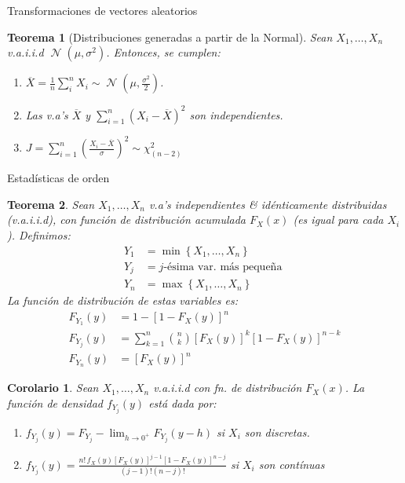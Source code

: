 \documentclass[a4paper]{article}
\theoremstyle{mytheoremstyle}
\newtheorem{theorem}{Teorema}
\newtheorem{corollary}{Corolario}[theorem]
\newcommand{\1}{\mathds{1}}
\DeclareMathOperator{\dnormal}{\mathcal{N}}
\begin{document}
\begin{multicols*}{3}
\begin{roundbox}{Transformaciones de vectores aleatorios}
\begin{theorem}[Distribuciones generadas a partir de la Normal]
    Sean $X_1, \dots, X_n$ v.a.i.i.d $\dnormal(\mu, \sigma^{2})$.
    Entonces, se cumplen:
    \begin{enumerate}
        \item $\overline{X} = \frac{1}{n} \sum_{i}^{n} X_i \sim \dnormal(\mu, \frac{\sigma^{2}}{2})$.
        \item Las v.a's $\overline{X}$ y $\sum_{i=1}^{n} (X_i - \overline{X})^{2}$ son independientes.
        \item $J= \sum_{i=1}^{n} \left( \frac{X_i - \overline{X}}{\sigma} \right)^{2} \sim \chi_{(n-2)}^{2}$
    \end{enumerate}
\end{theorem}
\end{roundbox}

\begin{roundbox}{Estadísticas de orden}
\begin{theorem}
    Sean $X_1, \dots, X_n$ v.a's independientes \& idénticamente distribuidas (v.a.i.i.d), con función de distribución acumulada $F_{X}(x)$ (es igual para cada $X_i$).
    Definimos:
    \begin{align*}
        Y_1 &= \min\left\{ X_1, \dots, X_n  \right\} \\
        Y_j &= j\text{-ésima var. más pequeña } \\
        Y_n &= \max\left\{ X_1, \dots, X_n \right\} 
    \end{align*}
    La función de distribución de estas variables es:
    \begin{align*}
        F_{Y_1}(y) &= 1 - \left[ 1 - F_X(y) \right]^{n} \\
        F_{Y_j}(y) &= \sum_{k=1}^{n} \binom{n}{k} \left[ F_X (y) \right]^{k} \left[ 1 - F_X(y) \right]^{n-k} \\
        F_{Y_n}(y) &= \left[ F_X(y) \right]^{n}
    \end{align*}
\end{theorem}

\begin{corollary}
    Sean $X_1, \dots, X_n$ v.a.i.i.d con fn. de distribución $F_X(x)$.
    La función de densidad $f_{Y_j}(y)$ está dada por:
    \begin{enumerate}
        \item $f_{Y_j}(y)= F_{Y_j} - \lim_{h\to 0^{+}} F_{Y_j}(y-h)$ si $X_i$ son discretas.
        \item $\displaystyle f_{Y_j}(y) = \frac{n! \,f_X(y) \left[ F_X(y) \right]^{j-1} \left[ 1 - F_X(y) \right]^{n-j}}{(j-1)!(n-j)!}$ si $X_i$ son contínuas
    \end{enumerate}
\end{corollary}
\end{roundbox}

\end{multicols*}
\end{document}
